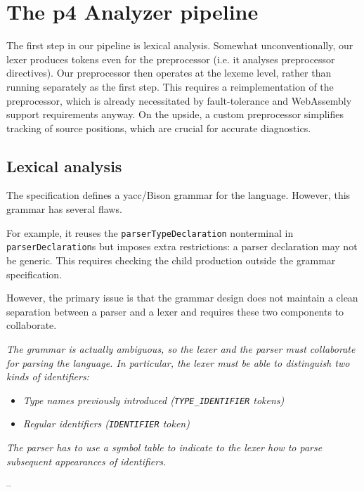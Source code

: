 \section{The \acrshort{p4} Analyzer pipeline}

The first step in our pipeline is lexical analysis. Somewhat unconventionally,
our lexer produces tokens even for the preprocessor (i.e. it analyses
preprocessor directives). Our preprocessor then operates at the lexeme level,
rather than running separately as the first step. This requires a
reimplementation of the preprocessor, which is already necessitated by
fault-tolerance and WebAssembly support requirements anyway. On the upside, a
custom preprocessor simplifies tracking of source positions, which are crucial
for accurate diagnostics.

\subsection{Lexical analysis}

The \pfs specification defines a \acrshort{yacc}/Bison grammar for the language. However, this grammar has
several flaws.

For example, it reuses the \texttt{parserTypeDeclaration} non\-terminal in
\texttt{parserDeclaration}s but imposes extra restrictions: a parser declaration
may not be generic. This requires checking the child production outside the
grammar specification.

However, the primary issue is that the grammar design does not maintain a clean
separation between a parser and a lexer and requires these two components to
collaborate.

\begin{displayquote}
	\textit{The grammar is actually ambiguous, so the lexer and the parser must
	collaborate for parsing the language. In particular, the lexer must be able
	to distinguish two kinds of identifiers:}

	\begin{itemize}
		\item \textit{Type names previously introduced (\texttt{TYPE\_IDENTIFIER}
		tokens)}
		\item \textit{Regular identifiers (\texttt{IDENTIFIER} token)}
	\end{itemize}

	\textit{The parser has to use a symbol table to indicate to the lexer how to
	parse subsequent appearances of identifiers.}

	--  \cite{p416:v123:spec}
\end{displayquote}


